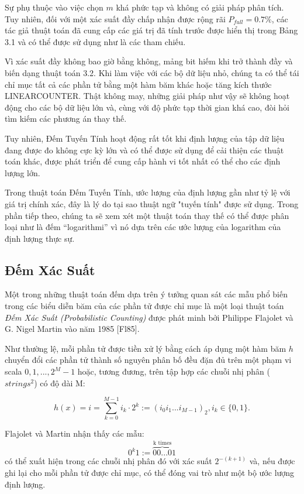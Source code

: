 \documentclass[a4paper,13pt]{article}
\theoremstyle{mytheor}
\begin{document}
Sự phụ thuộc vào việc chọn $m$ khá phức tạp và không có giải pháp phân tích. Tuy nhiên, đối với một xác suất đầy chấp nhận được rộng rãi $P_{full} = 0.7\%$, 
các tác giả thuật toán đã cung cấp các giá trị đã tính trước được hiển thị trong Bảng 3.1 và có thể được sử dụng như là các tham chiếu.

Vì xác suất đầy không bao giờ bằng không, mảng bit hiếm khi trở thành đầy và biến dạng thuật toán 3.2. Khi làm việc với các bộ dữ liệu nhỏ, chúng ta 
có thể tái chỉ mục tất cả các phần tử bằng một hàm băm khác hoặc tăng kích thước LINEARCOUNTER. Thật không may, những giải pháp như vậy 
sẽ không hoạt động cho các bộ dữ liệu lớn và, cùng với độ phức tạp thời gian khá cao, đòi hỏi tìm kiếm các phương án thay thế.

Tuy nhiên, Đếm Tuyến Tính hoạt động rất tốt khi định lượng của tập dữ liệu đang được đo không cực kỳ lớn và có thể được sử dụng để cải thiện các thuật toán 
khác, được phát triển để cung cấp hành vi tốt nhất có thể cho các định lượng lớn.

Trong thuật toán Đếm Tuyến Tính, ước lượng của định lượng gần như tỷ lệ với giá trị chính xác, đây là lý do tại sao thuật ngữ "tuyến tính" được sử dụng. 
Trong phần tiếp theo, chúng ta sẽ xem xét một thuật toán thay thế có thể được phân loại như là đếm \textquotedblleft logarithmi\textquotedblright\space 
vì nó dựa trên các ước lượng của logarithm của định lượng thực sự.
\subsection{Đếm Xác Suất}
Một trong những thuật toán đếm dựa trên ý tưởng quan sát các mẫu phổ biến trong các biểu diễn băm của các phần tử được chỉ mục là một loại 
thuật toán \textit{Đếm Xác Suất (Probabilistic Counting)} được phát minh bởi Philippe Flajolet và G. Nigel Martin vào năm 1985 [Fl85].

Như thường lệ, mỗi phần tử được tiền xử lý bằng cách áp dụng một hàm băm $h$ chuyển đổi các phần tử thành số nguyên phân bố đều đặn đủ 
trên một phạm vi scala ${0, 1,...,2^M - 1}$ hoặc, tương đương, trên tập hợp các chuỗi nhị phân ($strings^2$) có độ dài M:

\[h(x) = i = \sum_{k=0}^{M-1} i_k\cdot 2^k := (i_0i_1...i_{M-1})_2, i_k \in \{0,1\}.\]

Flajolet và Martin nhận thấy các mẫu:
\[0^k1 := \overbrace{00...0}^{\text{k times}}1\]
có thể xuất hiện trong các chuỗi nhị phân đó với xác suất $2^{-(k+1)}$ và, nếu được ghi lại cho mỗi phần tử được chỉ mục, có thể đóng vai trò 
như một bộ ước lượng định lượng.
\end{document}
